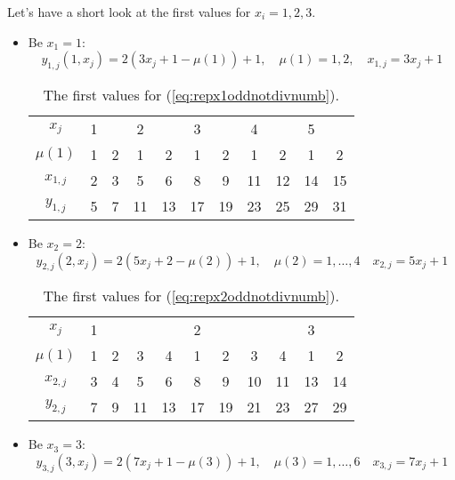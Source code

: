 Let's have a short look at the first values for $x_{i} = 1,2,3$.
\begin{itemize}
	\item Be $x_{1} = 1$:
		\begin{equation}
			y_{1,j}\left(1,x_{j}\right) = 2\left(3x_{j} + 1 - \mu\left(1\right)\right) + 1, \quad \mu\left(1\right) = 1,2, \quad x_{1,j} = 3x_{j} + 1
		\label{eq:repx1oddnotdivnumb}
		\end{equation}

		\begin{table}[H]
		\centering
		\caption{The first values for (\ref{eq:repx1oddnotdivnumb}).}
		\begin{tabular}{c|cccccccccc}
  			$x_{j}$ & 1 &  & 2 &  & 3 &  & 4 &  & 5 &  \\
			$\mu\left(1\right)$ & 1 & 2 & 1 & 2 & 1 & 2 & 1 & 2 & 1 & 2 \\
  		\hline	$x_{1,j}$ & 2 & 3 & 5 & 6 & 8 & 9 & 11 & 12 & 14 & 15 \\
  			$y_{1,j}$ & 5 & 7 & 11 & 13 & 17 & 19 & 23 & 25 & 29 & 31 \\
		\end{tabular}
		\label{tab:repodnotdivnumbx1}
		\end{table}

	\item Be $x_{2} = 2$:
		\begin{equation}
			y_{2,j}\left(2,x_{j}\right) = 2\left(5x_{j} + 2 - \mu\left(2\right)\right) + 1, \quad \mu\left(2\right) = 1,\dots,4 \quad x_{2,j} = 5x_{j} + 1
		\label{eq:repx2oddnotdivnumb}
		\end{equation}

		\begin{table}[H]
		\centering
		\caption{The first values for (\ref{eq:repx2oddnotdivnumb}).}
		\begin{tabular}{c|cccccccccc}
  			$x_{j}$ & 1 &  &  &  & 2 &  &  &  & 3 &  \\
			$\mu\left(1\right)$ & 1 & 2 & 3 & 4 & 1 & 2 & 3 & 4 & 1 & 2 \\
  		\hline	$x_{2,j}$ & 3 & 4 & 5 & 6 & 8 & 9 & 10 & 11 & 13 & 14 \\
  			$y_{2,j}$ & 7 & 9 & 11 & 13 & 17 & 19 & 21 & 23 & 27 & 29 \\
		\end{tabular}
		\label{tab:repodnotdivnumbx2}
		\end{table}

	\item Be $x_{3} = 3$:
		\begin{equation}
			y_{3,j}\left(3,x_{j}\right) = 2\left(7x_{j} + 1 - \mu\left(3\right)\right) + 1, \quad \mu\left(3\right) = 1,\dots,6 \quad x_{3,j} = 7x_{j} + 1
		\label{eq:repx3oddnotdivnumb}
		\end{equation}


\end{itemize}
